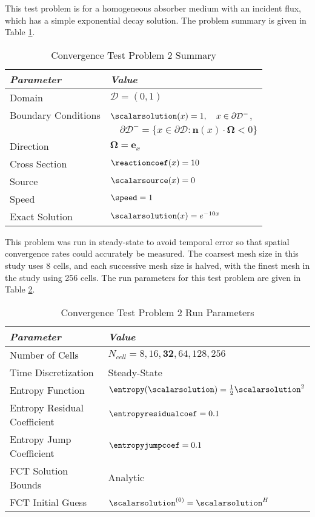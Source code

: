 This test problem is for a homogeneous absorber medium with an incident
flux, which has a simple exponential decay solution.
The problem summary is given in Table \ref{tab:absorber}.

\begin{table}[htb]\caption{Convergence Test Problem 2 Summary}
\label{tab:absorber}
\centering
\begin{tabular}{l l}\toprule
\emph{Parameter} & \emph{Value}\\\midrule
Domain & $\mathcal{D} = (0,1)$\\
Boundary Conditions & $\scalarsolution(x)=1,\quad x\in\partial\mathcal{D}^-$,\\
   & $\quad\partial\mathcal{D}^-=\{x\in\partial\mathcal{D}:\mathbf{n}(x)
       \cdot\mathbf{\Omega}<0\}$\\
Direction & $\mathbf{\Omega} = \mathbf{e}_x$\\
Cross Section & $\reactioncoef(x)=10$\\
Source & $\scalarsource(x)=0$\\
Speed & $\speed=1$\\
Exact Solution & $\scalarsolution(x)=e^{-10x}$\\
\bottomrule\end{tabular}
\end{table}

This problem was run in steady-state to avoid temporal error so that spatial
convergence rates could accurately be measured.
The coarsest mesh size in this study uses 8 cells, and each successive mesh
size is halved, with the finest mesh in the study using 256 cells.
The run parameters for this test problem are given in Table
\ref{tab:absorber_ss_run_parameters}.

\begin{table}[htb]
\caption{Convergence Test Problem 2 Run Parameters}
\label{tab:absorber_ss_run_parameters}
\centering
\begin{tabular}{l l}\toprule
\emph{Parameter} & \emph{Value}\\\midrule
Number of Cells & $N_{cell} = 8,16,\mathbf{32},64,128,256$\\
Time Discretization & Steady-State\\\midrule
Entropy Function & $\entropy(\scalarsolution) = \frac{1}{2}\scalarsolution^2$\\
Entropy Residual Coefficient & $\entropyresidualcoef = 0.1$\\
Entropy Jump Coefficient & $\entropyjumpcoef = 0.1$\\\midrule
FCT Solution Bounds & Analytic\\
FCT Initial Guess & $\scalarsolution^{(0)} = \scalarsolution^H$\\
\bottomrule\end{tabular}
\end{table}

